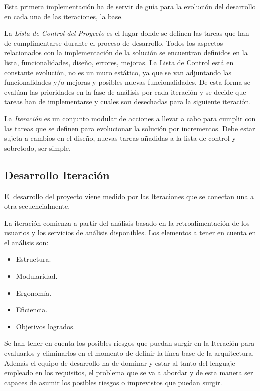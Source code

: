 \par Esta primera implementación ha de servir de guía para la evolución del desarrollo en cada una de las iteraciones, la base.

\par La \emph{Lista de Control del Proyecto} es el lugar donde se definen las tareas que han de cumplimentarse durante el proceso de desarrollo. Todos los aspectos relacionados con la implementación de la solución se encuentran definidos en la lista, funcionalidades, diseño, errores, mejoras. La Lista de Control está en constante evolución, no es un muro estático, ya que se van adjuntando las funcionalidades y/o mejoras y posibles nuevas funcionalidades. De esta forma se evalúan las prioridades en la fase de análisis por cada iteración y se decide que tareas han de implementarse y cuales son desechadas para la siguiente iteración.

\par La \emph{Iteración} es un conjunto modular de acciones a llevar a cabo para cumplir con las tareas que se definen para evolucionar la solución por incrementos. Debe estar sujeta a cambios en el diseño, nuevas tareas añadidas a la lista de control y sobretodo, ser simple.


\subsection{Desarrollo Iteración}
\label{sub:desarrollo-iteracion}

\par El desarrollo del proyecto viene medido por las Iteraciones que se conectan una a otra secuencialmente.

\par La iteración comienza a partir del análisis basado en la retroalimentación de los usuarios y los servicios de análisis disponibles. Los elementos a tener en cuenta en el análisis son:

\begin{itemize}
	\item Estructura.
	\item Modularidad.
	\item Ergonomía.
	\item Eficiencia.
	\item Objetivos logrados.
\end{itemize}

\par Se han tener en cuenta los posibles riesgos que puedan surgir en la Iteración para evaluarlos y eliminarlos en el momento de definir la línea base de la arquitectura. Además el equipo de desarrollo ha de dominar y estar al tanto del lenguaje empleado en los requisitos, el problema que se va a abordar y de esta manera ser capaces de asumir los posibles riesgos o imprevistos que puedan surgir.

